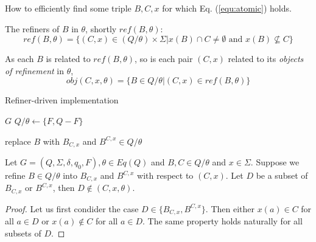 How to efficiently find some triple $B,C,x$ for which Eq. (\ref{equ:atomic}) holds.

The refiners of $B$ in $\theta$, shortly $ref(B,\theta)$:
\[ref(B,\theta)=\{(C,x)\in(Q/\theta)\times\Sigma|x(B)\cap C\ne\emptyset \text{ and } x(B)\nsubseteq C \} \]

As each $B$ is related to $ref(B,\theta)$, so is each pair $(C,x)$ related to its \textit{objects of refinement} in $\theta$,
\[obj(C,x,\theta)=\{B\in Q/\theta|(C,x)\in ref(B,\theta) \} \]

\begin{algorithm}  
	\caption{Refiner-driven implementation}  \label{alg:refiner-driven}
	\begin{algorithmic}[1] %
		 {$G$}
		\State $Q/\theta\gets \{F,Q-F\}$
		
			\State replace $B$ with $B_{C,x}$ and $B^{C,x}\in Q/\theta$
		\EndFor
		\EndWhile
		
		\State \Return{$\theta$}  
		\EndFunction 
	\end{algorithmic}
\end{algorithm}

\begin{lemma} \label{lemma:refine_B}
	Let $G=(Q,\Sigma,\delta,q_0,F),\theta\in Eq(Q)$ and $B,C\in Q/\theta$ and $x\in\Sigma$. Suppose we refine $B\in Q/\theta$ into $B_{C,x}$ and $B^{C,x}$ with respect to $(C,x)$. Let $D$ be a subset of $B_{C,x}$ or $B^{C,x}$, then $D\notin(C,x,\theta)$.
\end{lemma}

\begin{proof}
	Let us first condider the case $D\in\{B_{C,x},B^{C,x}\}$. Then either $x(a)\in C$ for all $a\in D$ or $x(a)\notin C$ for all $a\in D$. The same property holds naturally for all subsets of $D$.
\end{proof}

